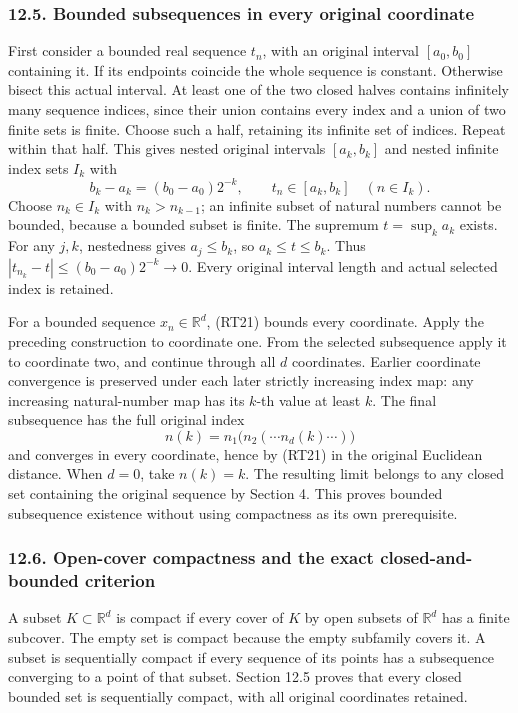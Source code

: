 \documentclass[
  11pt,
]{article}
\begin{document}
\subsubsection{12.5. Bounded subsequences in every original
coordinate}\label{bounded-subsequences-in-every-original-coordinate}

First consider a bounded real sequence \(t_n\), with an original
interval \([a_0,b_0]\) containing it. If its endpoints coincide the
whole sequence is constant. Otherwise bisect this actual interval. At
least one of the two closed halves contains infinitely many sequence
indices, since their union contains every index and a union of two
finite sets is finite. Choose such a half, retaining its infinite set of
indices. Repeat within that half. This gives nested original intervals
\([a_k,b_k]\) and nested infinite index sets \(I_k\) with \[
b_k-a_k=(b_0-a_0)2^{-k},\qquad
t_n\in[a_k,b_k]\quad(n\in I_k).
\tag{RT22}
\] Choose \(n_k\in I_k\) with \(n_k>n_{k-1}\); an infinite subset of
natural numbers cannot be bounded, because a bounded subset is finite.
The supremum \(t=\sup_k a_k\) exists. For any \(j,k\), nestedness gives
\(a_j\le b_k\), so \(a_k\le t\le b_k\). Thus
\(|t_{n_k}-t|\le(b_0-a_0)2^{-k}\to0\). Every original interval length
and actual selected index is retained.

For a bounded sequence \(x_n\in\mathbb R^d\), (RT21) bounds every
coordinate. Apply the preceding construction to coordinate one. From the
selected subsequence apply it to coordinate two, and continue through
all \(d\) coordinates. Earlier coordinate convergence is preserved under
each later strictly increasing index map: any increasing natural-number
map has its \(k\)-th value at least \(k\). The final subsequence has the
full original index \[
n(k)=n_1\bigl(n_2(\cdots n_d(k)\cdots)\bigr)
\tag{RT23}
\] and converges in every coordinate, hence by (RT21) in the original
Euclidean distance. When \(d=0\), take \(n(k)=k\). The resulting limit
belongs to any closed set containing the original sequence by Section 4.
This proves bounded subsequence existence without using compactness as
its own prerequisite.

\subsubsection{12.6. Open-cover compactness and the exact
closed-and-bounded
criterion}\label{open-cover-compactness-and-the-exact-closed-and-bounded-criterion}

A subset \(K\subset\mathbb R^d\) is compact if every cover of \(K\) by
open subsets of \(\mathbb R^d\) has a finite subcover. The empty set is
compact because the empty subfamily covers it. A subset is sequentially
compact if every sequence of its points has a subsequence converging to
a point of that subset. Section 12.5 proves that every closed bounded
set is sequentially compact, with all original coordinates retained.
\end{document}

